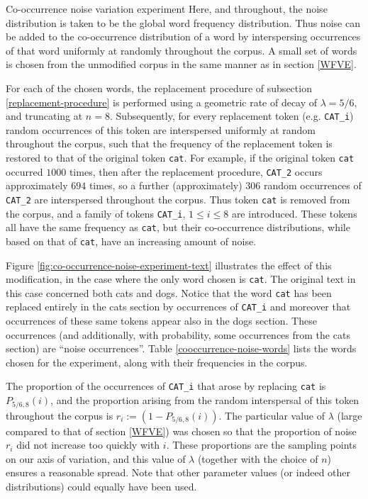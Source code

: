 \documentclass{article} %
\newcommand{\word}[1]{\texttt{#1}}
\begin{document}
\begin{section}{Co-occurrence noise variation experiment}\label{CNVE}
Here, and throughout, the noise distribution is taken to be the global word frequency distribution.
Thus noise can be added to the co-occurrence distribution of a word by interspersing occurrences of that word uniformly at randomly throughout the corpus.
A small set of words is chosen from the unmodified corpus in the same manner as in section \ref{WFVE}.

For each of the chosen words, the replacement procedure of subsection \ref{replacement-procedure} is performed using a geometric rate of decay of $\lambda = 5/6$, and truncating at $n=8$.
Subsequently, for every replacement token (e.g. \word{CAT\_i}) random occurrences of this token are interspersed uniformly at random throughout the corpus, such that the frequency of the replacement token is restored to that of the original token \word{cat}.
For example, if the original token \word{cat} occurred $1000$ times, then after the replacement procedure, \word{CAT\_2} occurs approximately $694$ times, so a further (approximately) $306$ random occurrences of \word{CAT\_2} are interspersed throughout the corpus.
Thus token \word{cat} is removed from the corpus, and a family of tokens \word{CAT\_i}, $1 \leqslant i \leqslant 8$ are introduced.
These tokens all have the same frequency as \word{cat}, but their co-occurrence distributions, while based on that of \word{cat}, have an increasing amount of noise.

Figure \ref{fig:co-occurrence-noise-experiment-text} illustrates the effect of this modification, in the case where the only word chosen is \word{cat}.
The original text in this case concerned both cats and dogs.
Notice that the word \word{cat} has been replaced entirely in the cats section by occurrences of \word{CAT\_i} and moreover that occurrences of these same tokens appear also in the dogs section. These occurrences (and additionally, with probability, some occurrences from the cats section) are ``noise occurrences''.
Table \ref{cooccurrence-noise-words} lists the words chosen for the experiment, along with their frequencies in the corpus.

The proportion of the occurrences of \word{CAT\_i} that arose by replacing \word{cat} is $P_{5/6, 8}(i)$, and the proportion arising from the random interspersal of this token throughout the corpus is $r_i := (1 - P_{5/6, 8}(i))$.
The particular value of $\lambda$ (large compared to that of section \ref{WFVE}) was chosen so that the proportion of noise $r_i$ did not increase too quickly with $i$.
These proportions are the sampling points on our axis of variation, and this value of $\lambda$ (together with the choice of $n$) ensures a reasonable spread.
Note that other parameter values (or indeed other distributions) could equally have been used.


\end{section}
\end{document}
